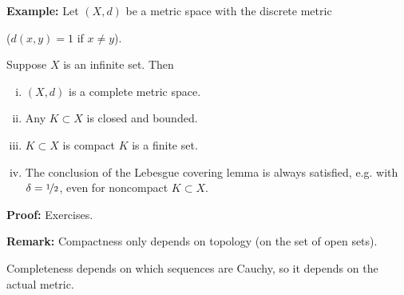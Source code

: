 \documentclass[10pt,aspectratio=149]{beamer}
\begin{document}
\begin{frame}

\textbf{Example:}
Let $(X,d)$ be a metric space with the discrete metric

($d(x,y) = 1$ if $x \not= y$).

\pause
Suppose $X$ is an infinite set.  Then
\begin{enumerate}[(i)]
\item
\pause
$(X,d)$ is a complete metric space.
\item
\pause
Any $K \subset X$ is closed and bounded.
\item
\pause
$K \subset X$ is compact \wiffif $K$ is a finite set.
\item
\pause
The conclusion of the Lebesgue covering lemma is always satisfied,
e.g. with $\delta = \nicefrac{1}{2}$,
even for noncompact $K \subset X$.
\end{enumerate}

\pause
\textbf{Proof:} Exercises.

\pause
\medskip

\textbf{Remark:}
Compactness only depends on topology (on the set of open sets).

\pause
\medskip

Completeness depends on which sequences are Cauchy, so
it depends on the actual metric.

\end{frame}
\end{document}
